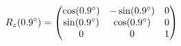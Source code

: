 \documentclass[preview]{standalone}
\begin{document}
\begin{align*}
\special{dvisvgm:raw <g id='unique000'>}R_z(0.9^\circ) = \begin{pmatrix} \cos(0.9^\circ) & -\sin(0.9^\circ) & 0 \\ \sin(0.9^\circ) & \cos(0.9^\circ) & 0 \\ 0 & 0 & 1 \end{pmatrix}\special{dvisvgm:raw </g>}
\end{align*}
\end{document}

